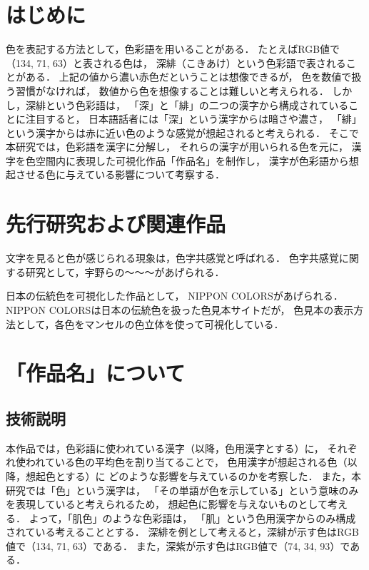 \documentclass[a4j,twocolumn]{ujarticle} %
\newcommand{\workname}{「作品名」}
\newcommand{\colorname}{色彩語}
\newcommand{\colorkanji}{色用漢字}
\newcommand{\recallcolor}{想起色}
\begin{document}
\maketitle
\thispagestyle{myheadings}

\section{はじめに}

色を表記する方法として，\colorname{}を用いることがある．
たとえばRGB値で（134, 71, 63）と表される色は，
深緋（こきあけ）という\colorname{}で表されることがある．
上記の値から濃い赤色だということは想像できるが，
色を数値で扱う習慣がなければ，
数値から色を想像することは難しいと考えられる．
しかし，深緋という\colorname{}は，
「深」と「緋」の二つの漢字から構成されていることに注目すると，
日本語話者には「深」という漢字からは暗さや濃さ，
「緋」という漢字からは赤に近い色のような感覚が想起されると考えられる．
そこで本研究では，\colorname{}を漢字に分解し，
それらの漢字が用いられる色を元に，
漢字を色空間内に表現した可視化作品\workname{}を制作し，
漢字が\colorname{}から想起させる色に与えている影響について考察する．

\section{先行研究および関連作品}

文字を見ると色が感じられる現象は，色字共感覚と呼ばれる．
色字共感覚に関する研究として，宇野ら\cite{Uno2018}の〜〜〜があげられる．

日本の伝統色を可視化した作品として，
NIPPON COLORS\cite{NipponColors}があげられる．
NIPPON COLORSは日本の伝統色を扱った色見本サイトだが，
色見本の表示方法として，各色をマンセルの色立体を使って可視化している．

\section{\workname{}について}

\subsection{技術説明}

本作品では，\colorname{}に使われている漢字（以降，\colorkanji{}とする）に，
それぞれ使われている色の平均色を割り当てることで，
\colorkanji{}が想起される色（以降，\recallcolor{}とする）に
どのような影響を与えているのかを考察した．
また，本研究では「色」という漢字は，
「その単語が色を示している」という意味のみを表現していると考えられるため，
\recallcolor{}に影響を与えないものとして考える．
よって，「肌色」のような\colorname{}は，
「肌」という\colorkanji{}からのみ構成されている考えることとする．
深緋を例として考えると，深緋が示す色はRGB値で（134, 71, 63）である．
また，深紫が示す色はRGB値で（74, 34, 93）である．
\end{document}
